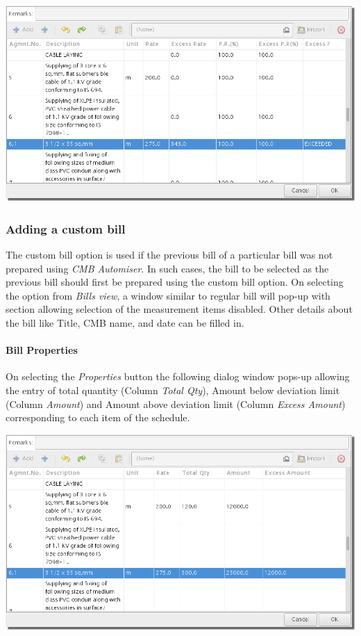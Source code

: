 \documentclass[twoside,a4paper]{refart}
\begin{document}
	 \begin{maxipage}
	 	\includegraphics[width=1\linewidth]{screenshots/window_bill_prop.png}
	 \end{maxipage}
	 
	 \subsubsection{Adding a custom bill}
	 
	 \attention The custom bill option is used if the previous bill of a particular bill was not prepared using \emph{CMB Automiser}. In such cases, the bill to be selected as the previous bill should first be prepared using the custom bill option. On selecting the option from \emph{Bills view}, a window similar to regular bill will pop-up with section allowing selection of the measurement items disabled. Other details about the bill like Title, CMB name, and date can be filled in.\\
	 
	 \paragraph{Bill Properties}
	 
	 On selecting the \emph{Properties} button the following dialog window pops-up allowing the entry of total quantity (Column \emph{Total Qty}), Amount below deviation limit (Column \emph{Amount}) and Amount above deviation limit  (Column \emph{Excess Amount}) corresponding to each item of the schedule.
	
	 \begin{maxipage}
	 	\includegraphics[width=1\linewidth]{screenshots/window_bill_cust_prop.png}
	 \end{maxipage}
	 
\end{document}
